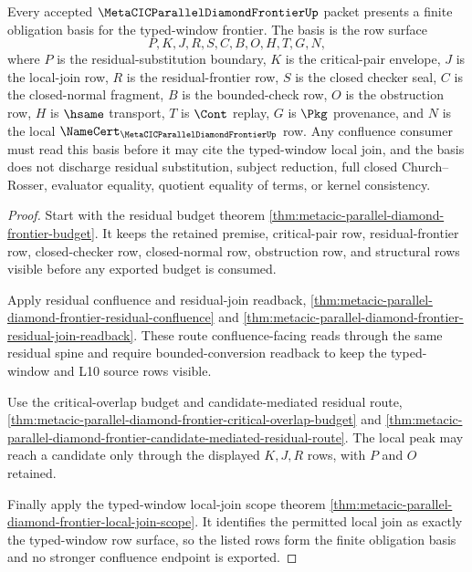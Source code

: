 \begin{theorem}
\label{thm:metacic-parallel-diamond-frontier-obligation-basis}
Every accepted $\MetaCICParallelDiamondFrontierUp$ packet presents a finite obligation basis for the typed-window frontier. The basis is the row surface
$$
P,K,J,R,S,C,B,O,H,T,G,N,
$$
where $P$ is the residual-substitution boundary, $K$ is the critical-pair envelope, $J$ is the local-join row, $R$ is the residual-frontier row, $S$ is the closed checker seal, $C$ is the closed-normal fragment, $B$ is the bounded-check row, $O$ is the obstruction row, $H$ is $\hsame$ transport, $T$ is $\Cont$ replay, $G$ is $\Pkg$ provenance, and $N$ is the local $\NameCert_{\MetaCICParallelDiamondFrontierUp}$ row. Any confluence consumer must read this basis before it may cite the typed-window local join, and the basis does not discharge residual substitution, subject reduction, full closed Church--Rosser, evaluator equality, quotient equality of terms, or kernel consistency.
\end{theorem}
\begin{proof}
Start with the residual budget theorem \autoref{thm:metacic-parallel-diamond-frontier-budget}. It keeps the retained premise, critical-pair row, residual-frontier row, closed-checker row, closed-normal row, obstruction row, and structural rows visible before any exported budget is consumed.

Apply residual confluence and residual-join readback, \autoref{thm:metacic-parallel-diamond-frontier-residual-confluence} and \autoref{thm:metacic-parallel-diamond-frontier-residual-join-readback}. These route confluence-facing reads through the same residual spine and require bounded-conversion readback to keep the typed-window and L10 source rows visible.

Use the critical-overlap budget and candidate-mediated residual route, \autoref{thm:metacic-parallel-diamond-frontier-critical-overlap-budget} and \autoref{thm:metacic-parallel-diamond-frontier-candidate-mediated-residual-route}. The local peak may reach a candidate only through the displayed $K,J,R$ rows, with $P$ and $O$ retained.

Finally apply the typed-window local-join scope theorem \autoref{thm:metacic-parallel-diamond-frontier-local-join-scope}. It identifies the permitted local join as exactly the typed-window row surface, so the listed rows form the finite obligation basis and no stronger confluence endpoint is exported.
\end{proof}

